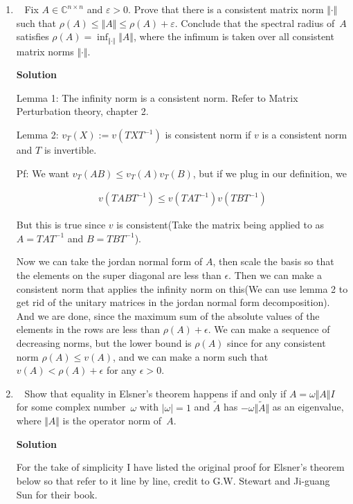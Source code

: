 \documentclass[11pt]{article}
\newcommand\score[1]{\marginpar{\vspace{-2ex}\color{blue}{#1/14}}\hspace{-1ex}}
\newcommand\0{\mathbf{0}}
\newcommand\CC{\mathbb{C}}
\newcommand\<{\langle}
\renewcommand\>{\rangle}
\begin{document}
\begin{enumerate}
\item\ \score{}%
Fix $A \in \CC^{n \times n}$ and $\varepsilon > 0$.  Prove that there
is a consistent matrix norm $\Vert\cdot\Vert$ such that $\rho(A) \leq
\Vert A \Vert \leq \rho(A) + \varepsilon$.  Conclude that the spectral
radius of~$A$ satisfies $\rho(A) = \inf_{\Vert\cdot\Vert}\Vert A
\Vert$, where the infimum is taken over all consistent matrix norms
$\Vert\cdot\Vert$.

\textbf{Solution}

Lemma 1: The infinity norm is a consistent norm. Refer to Matrix Perturbation theory, 
chapter 2. 

Lemma 2: $v_{T}(X):=v(TXT^{-1})$ is consistent norm if $v$ is a consistent norm and $T$ is invertible.

Pf: We want $v_{T}(AB)\leq v_{T}(A)v_{T}(B)$, but if we plug in our definition, we 

\begin{align*}
	v(TABT^{-1}) \leq v(TAT^{-1})v(TBT^{-1})
\end{align*}

But this is true since $v$ is consistent(Take the matrix being applied to as $A=TAT^{-1}$ and $B=TBT^{-1}$).

Now we can take the jordan normal form of $A$, then scale the basis so that the elements 
on the super diagonal are less than $\epsilon$. Then we can make a consistent norm that applies the infinity norm 
on this(We can use lemma 2 to get rid of the unitary matrices in the jordan normal form decomposition). And we are done, since 
the maximum sum of the absolute values of the elements in the rows are less than $\rho(A)+\epsilon$. We can make a 
sequence of decreasing norms, but the lower bound is $\rho(A)$ since for any consistent norm $\rho(A)\leq v(A)$, and we can make 
a norm such that $v(A)<\rho(A) +\epsilon $ for any $\epsilon >0$. 

\item\ \score{}%
Show that equality in Elsner's theorem happens if and only if $A =
\omega\Vert A\Vert I$ for some complex number~$\omega$ with $|\omega|
= 1$ and $\widetilde A$ has $-\omega\Vert \widetilde A\Vert$ as an
eigenvalue, where $\Vert A\Vert$ is the operator norm of~$A$.

\textbf{Solution}

For the take of simplicity I have listed the original proof for Elsner's theorem below so that refer to it line by line, credit to G.W. Stewart and Ji-guang Sun for their book.


\end{enumerate}
\end{document}
